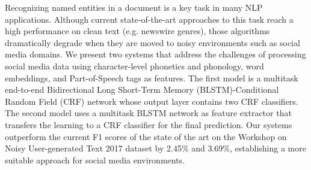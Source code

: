 Recognizing named entities in a document is a key task in many NLP applications. Although current state-of-the-art approaches to this task reach a high performance on clean text (e.g. newswire genres), those algorithms dramatically degrade when they are moved to noisy environments such as social media domains. We present two systems that address the challenges of processing social media data using character-level phonetics and phonology, word embeddings, and Part-of-Speech tags as features. The first model is a multitask end-to-end Bidirectional Long Short-Term Memory (BLSTM)-Conditional Random Field (CRF) network whose output layer contains two CRF classifiers. The second model uses a multitask BLSTM network as feature extractor that transfers the learning to a CRF classifier for the final prediction. Our systems outperform the current F1 scores of the state of the art on the Workshop on Noisy User-generated Text 2017 dataset by 2.45\% and 3.69\%, establishing a more suitable approach for social media environments.
